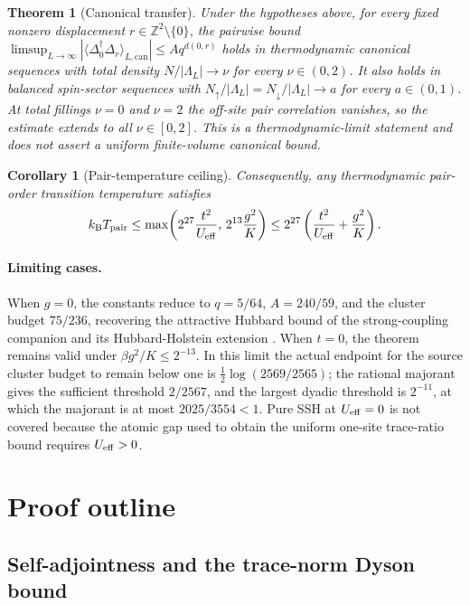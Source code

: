 \documentclass[11pt]{article}
\newtheorem{theorem}{Theorem}
\newtheorem{corollary}{Corollary}
\newcommand{\Deltaop}{\Delta}
\begin{document}
\begin{theorem}[Canonical transfer]
Under the hypotheses above, for every fixed nonzero displacement $r\in\mathbb{Z}^2\setminus\{0\}$, the pairwise bound $\limsup_{L\to\infty}|\langle\Deltaop_0^\dagger\Deltaop_r\rangle_{L,\mathrm{can}}|\le A q^{d(0,r)}$ holds in thermodynamic canonical sequences with total density $N/|\Lambda_L|\to\nu$ for every $\nu\in(0,2)$. It also holds in balanced spin-sector sequences with $N_\uparrow/|\Lambda_L|=N_\downarrow/|\Lambda_L|\to a$ for every $a\in(0,1)$. At total fillings $\nu=0$ and $\nu=2$ the off-site pair correlation vanishes, so the estimate extends to all $\nu\in[0,2]$. This is a thermodynamic-limit statement and does not assert a uniform finite-volume canonical bound.
\end{theorem}

\begin{corollary}[Pair-temperature ceiling]
Consequently, any thermodynamic pair-order transition temperature satisfies
\[
k_{\rm B}T_{\rm pair}
\le \max\!\left(2^{27}\frac{t^2}{U_{\rm eff}},\,2^{13}\frac{g^2}{K}\right)
\le 2^{27}\left(\frac{t^2}{U_{\rm eff}}+\frac{g^2}{K}\right).
\]
\end{corollary}

\paragraph{Limiting cases.}
When $g=0$, the constants reduce to $q=5/64$, $A=240/59$, and the cluster budget $75/236$, recovering the attractive Hubbard bound of the strong-coupling companion and its Hubbard-Holstein extension \cite{strongcoupling,hubbardholstein}. When $t=0$, the theorem remains valid under $\beta g^2/K\le2^{-13}$. In this limit the actual endpoint for the source cluster budget to remain below one is $\frac12\log(2569/2565)$; the rational majorant gives the sufficient threshold $2/2567$, and the largest dyadic threshold is $2^{-11}$, at which the majorant is at most $2025/3554<1$. Pure SSH at $U_{\rm eff}=0$ is not covered because the atomic gap used to obtain the uniform one-site trace-ratio bound requires $U_{\rm eff}>0$.

\section{Proof outline}

\subsection{Self-adjointness and the trace-norm Dyson bound}
\end{document}
